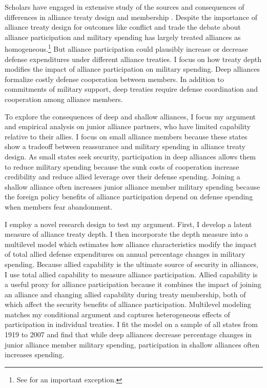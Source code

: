 \documentclass[12pt]{article}
\begin{document}
Scholars have engaged in extensive study of the sources and consequences of differences in alliance treaty design and membership \citep{Mattes2012, Benson2012, Poast2019a, Morrow1991, Leeds2003, LeedsAnac2005, Fordham2010, Mattes2012,  Poast2013, Johnsonetal2015}. 
Despite the importance of alliance treaty design for outcomes like conflict \citep{Leeds2003, Benson2012} and trade \citep{LongLeeds2006} the debate about alliance participation and military spending has largely treated alliances as homogeneous.\footnote{See \citet{DigiuseppePoast2016} for an important exception.}
But alliance participation could plausibly increase or decrease defense expenditures under different alliance treaties. 
I focus on how treaty depth modifies the impact of alliance participation on military spending. 
Deep alliances formalize costly defense cooperation between members. 
In addition to commitments of military support, deep treaties require defense coordination and cooperation among alliance members. 


To explore the consequences of deep and shallow alliances, I focus my argument and empirical analysis on junior alliance partners, who have limited capability relative to their allies. 
I focus on small alliance members because these states show a tradeoff between reassurance and military spending in alliance treaty design.
As small states seek security, participation in deep alliances allows them to reduce military spending because the sunk costs of cooperation increase credibility and reduce allied leverage over their defense spending. 
Joining a shallow alliance often increases junior alliance member military spending because the foreign policy benefits of alliance participation depend on defense spending when members fear abandonment.

 
I employ a novel research design to test my argument.
First, I develop a latent measure of alliance treaty depth. 
I then incorporate the depth measure into a multilevel model which estimates how alliance characteristics modify the impact of total allied defense expenditures on annual percentage changes in military spending.
Because allied capability is the ultimate source of security in alliances, I use total allied capability to measure alliance participation.  
Allied capability is a useful proxy for alliance participation because it combines the impact of joining an alliance and changing allied capability during treaty membership, both of which affect the security benefits of alliance participation. 
Multilevel modeling matches my conditional argument and captures heterogeneous effects of participation in individual treaties. 
I fit the model on a sample of all states from 1919 to 2007 and find that while deep alliances decrease percentage changes in junior alliance member military spending, participation in shallow alliances often increases spending.
\end{document}
